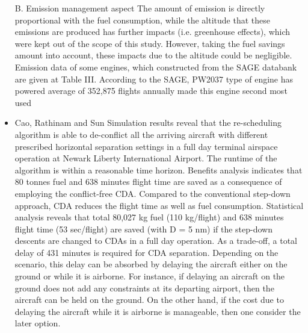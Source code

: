 \documentclass{aer1315-pretty}
\begin{document}
\begin{itemize}
B. Emission management aspect
The amount of emission is directly proportional with the fuel
consumption, while the altitude that these emissions are
produced has further impacts (i.e. greenhouse effects), which
were kept out of the scope of this study. However, taking the
fuel savings amount into account, these impacts due to the
altitude could be negligible.
   Emission data of some engines, which constructed from the
SAGE databank are given at Table III. According to the
SAGE, PW2037 type of engine has powered average of
352,875 flights annually made this engine second most used


\item Cao, Rathinam and Sun \cite{Cao:2011} 
Simulation results reveal that the re-scheduling algorithm is able to de-conflict all the arriving aircraft with different prescribed horizontal separation settings in a full day terminal airspace operation at Newark Liberty International Airport. The runtime of the algorithm is within a reasonable time horizon. Benefits analysis indicates that 80 tonnes fuel and 638 minutes flight time are saved as a consequence of employing the conflict-free CDA.
Compared to the conventional step-down approach, CDA reduces the flight time as well as fuel consumption.
Statistical analysis reveals that total 80,027 kg fuel (110 kg/flight) and 638 minutes flight time (53 sec/flight)
are saved (with D = 5 nm) if the step-down descents are changed to CDAs in a full day operation. As a
trade-off, a total delay of 431 minutes is required for CDA separation. Depending on the scenario, this delay
can be absorbed by delaying the aircraft either on the ground or while it is airborne. For instance, if delaying
an aircraft on the ground does not add any constraints at its departing airport, then the aircraft can be held
on the ground. On the other hand, if the cost due to delaying the aircraft while it is airborne is manageable,
then one consider the later option.



\end{itemize}
\end{document}
